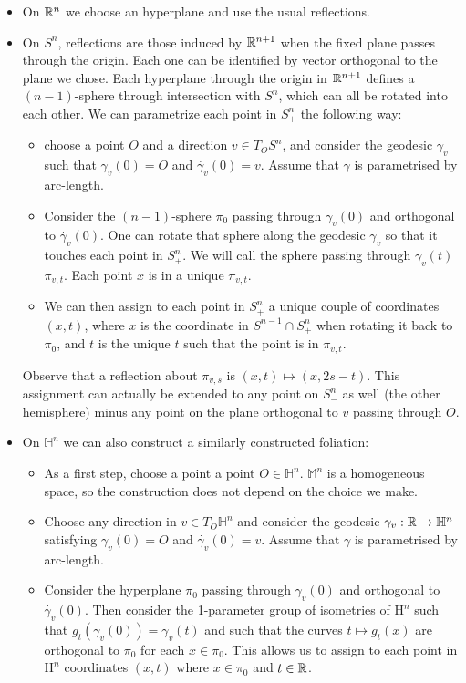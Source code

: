 \begin{itemize}	
	\item On $\mathbb{R}^n$ we choose an hyperplane and use the usual reflections.  
	\item On  $S^n$, reflections are those induced by $\mathbb{R}^{n+1}$ when the fixed plane passes through the origin. Each one can be identified by vector orthogonal to the plane we chose. Each hyperplane through the origin in $\mathbb{R}^{n+1}$ defines a $(n-1)$-sphere through intersection with $S^n$, which can all be rotated into each other. We can parametrize each point in $S^n_+$ the following way: 
	\begin{itemize}
		\item choose a point $O$ and a direction $v\in T_O S^n$, and consider the geodesic $\gamma_v$ such that $\gamma_v (0) = O$ and $\dot{\gamma_v} (0) = v$. Assume that $\gamma$ is parametrised by arc-length. 
		\item Consider the $(n-1)$-sphere $\pi_0$ passing through $\gamma_v(0)$ and orthogonal to  $\dot{\gamma_v}(0)$. One can rotate that sphere along the geodesic $\gamma_v$ so that it touches each point in $S^n_+$. We will call the sphere passing through $\gamma_v(t)$ $\pi_{v, t}$. Each point $x$ is in a unique $\pi_{v, t}$.
		\item We can then assign to each point in $S^n_+$ a unique couple of coordinates $(x, t)$, where $x$ is the coordinate in $S^{n-1}\cap S^n_+$ when rotating it back to $\pi_0$, and $t$ is the unique $t$ such that the point is in $\pi_{v, t}$.
	\end{itemize}
	Observe that a reflection about $\pi_{v, s}$ is $(x, t) \mapsto (x, 2s-t)$. This assignment can actually be extended to any point on $S^n_-$ as well (the other hemisphere) minus any point on the plane orthogonal to $v$ passing through $O$.
	\item On $\mathbb{H}^n$ we can also construct a similarly constructed foliation: 
	\begin{itemize}	
		\item As a first step, choose a point a point $O \in \mathbb{H}^n$. $\mathbb{M}^n$ is a homogeneous space, so the construction does not depend on the choice we make.
		\item Choose any direction in $v\in T_O\mathbb{H}^n$ and consider the geodesic $\gamma_v: \mathbb{R} \rightarrow \mathbb{H}^n$ satisfying $\gamma_v (0) = O$ and $\dot{\gamma_v} (0) = v$. Assume that $\gamma$ is parametrised by arc-length. 
		\item Consider the hyperplane $\pi_0$ passing through $\gamma_v(0)$ and orthogonal to  $\dot{\gamma_v}(0)$. Then consider the 1-parameter group of isometries of $\mathrm{H}^n$ such that $g_t(\gamma_v (0) )=\gamma_v (t) $ and such that the curves $t \mapsto g_t(x)$ are orthogonal to $\pi_0$ for each $x\in \pi_0$. This allows us to assign to each point in $\mathrm{H}^n$ coordinates $(x, t)$ where $x\in\pi_0$ and $t\in \mathbb{R}$.  

\end{itemize}
\end{itemize}
